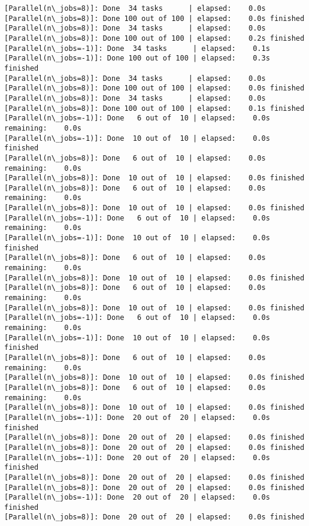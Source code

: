 \documentclass[11pt]{article}
\begin{document}
\begin{Verbatim}[commandchars=\\\{\}]
[Parallel(n\_jobs=8)]: Done  34 tasks      | elapsed:    0.0s
[Parallel(n\_jobs=8)]: Done 100 out of 100 | elapsed:    0.0s finished
[Parallel(n\_jobs=8)]: Done  34 tasks      | elapsed:    0.0s
[Parallel(n\_jobs=8)]: Done 100 out of 100 | elapsed:    0.2s finished
[Parallel(n\_jobs=-1)]: Done  34 tasks      | elapsed:    0.1s
[Parallel(n\_jobs=-1)]: Done 100 out of 100 | elapsed:    0.3s finished
[Parallel(n\_jobs=8)]: Done  34 tasks      | elapsed:    0.0s
[Parallel(n\_jobs=8)]: Done 100 out of 100 | elapsed:    0.0s finished
[Parallel(n\_jobs=8)]: Done  34 tasks      | elapsed:    0.0s
[Parallel(n\_jobs=8)]: Done 100 out of 100 | elapsed:    0.1s finished
[Parallel(n\_jobs=-1)]: Done   6 out of  10 | elapsed:    0.0s remaining:    0.0s
[Parallel(n\_jobs=-1)]: Done  10 out of  10 | elapsed:    0.0s finished
[Parallel(n\_jobs=8)]: Done   6 out of  10 | elapsed:    0.0s remaining:    0.0s
[Parallel(n\_jobs=8)]: Done  10 out of  10 | elapsed:    0.0s finished
[Parallel(n\_jobs=8)]: Done   6 out of  10 | elapsed:    0.0s remaining:    0.0s
[Parallel(n\_jobs=8)]: Done  10 out of  10 | elapsed:    0.0s finished
[Parallel(n\_jobs=-1)]: Done   6 out of  10 | elapsed:    0.0s remaining:    0.0s
[Parallel(n\_jobs=-1)]: Done  10 out of  10 | elapsed:    0.0s finished
[Parallel(n\_jobs=8)]: Done   6 out of  10 | elapsed:    0.0s remaining:    0.0s
[Parallel(n\_jobs=8)]: Done  10 out of  10 | elapsed:    0.0s finished
[Parallel(n\_jobs=8)]: Done   6 out of  10 | elapsed:    0.0s remaining:    0.0s
[Parallel(n\_jobs=8)]: Done  10 out of  10 | elapsed:    0.0s finished
[Parallel(n\_jobs=-1)]: Done   6 out of  10 | elapsed:    0.0s remaining:    0.0s
[Parallel(n\_jobs=-1)]: Done  10 out of  10 | elapsed:    0.0s finished
[Parallel(n\_jobs=8)]: Done   6 out of  10 | elapsed:    0.0s remaining:    0.0s
[Parallel(n\_jobs=8)]: Done  10 out of  10 | elapsed:    0.0s finished
[Parallel(n\_jobs=8)]: Done   6 out of  10 | elapsed:    0.0s remaining:    0.0s
[Parallel(n\_jobs=8)]: Done  10 out of  10 | elapsed:    0.0s finished
[Parallel(n\_jobs=-1)]: Done  20 out of  20 | elapsed:    0.0s finished
[Parallel(n\_jobs=8)]: Done  20 out of  20 | elapsed:    0.0s finished
[Parallel(n\_jobs=8)]: Done  20 out of  20 | elapsed:    0.0s finished
[Parallel(n\_jobs=-1)]: Done  20 out of  20 | elapsed:    0.0s finished
[Parallel(n\_jobs=8)]: Done  20 out of  20 | elapsed:    0.0s finished
[Parallel(n\_jobs=8)]: Done  20 out of  20 | elapsed:    0.0s finished
[Parallel(n\_jobs=-1)]: Done  20 out of  20 | elapsed:    0.0s finished
[Parallel(n\_jobs=8)]: Done  20 out of  20 | elapsed:    0.0s finished

\end{Verbatim}
\end{document}
